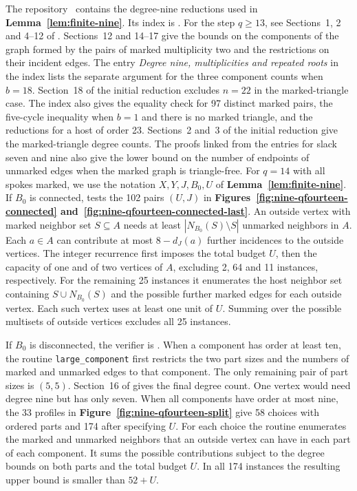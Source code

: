 \documentclass[preprint,11pt,numbers]{elsarticle-arxiv}
\numberwithin{equation}{section}
\theoremstyle{definition}
\begin{document}
The repository~\cite{FGSTCode} contains the degree-nine reductions
used in \textbf{Lemma~\ref{lem:finite-nine}}. Its index is
. For the step $q\geq13$, see
Sections~1, 2 and 4--12 of .
Sections~12 and 14--17 give the bounds on the components of the
graph formed by the pairs of marked multiplicity two and the
restrictions on their incident edges.
The entry \emph{Degree nine, multiplicities and repeated roots} in
the index lists the separate argument for the three component
counts when $b=18$. Section~18 of the initial reduction excludes
$n=22$ in the marked-triangle case.
The index also gives the equality check for 97 distinct marked
pairs, the five-cycle inequality when $b=1$ and there is no marked
triangle, and the reductions for a host of order 23. Sections~2
and~3 of the initial reduction give the marked-triangle degree counts.
The proofs linked from the entries for slack seven and nine also
give the lower bound on the number of endpoints of unmarked edges
when the marked graph is triangle-free.
For $q=14$ with all spokes marked, we use the notation $X,Y,J,B_0,U$
of \textbf{Lemma~\ref{lem:finite-nine}}. If $B_0$ is connected,
 tests the 102 pairs $(U,J)$ in
\textbf{Figures~\ref{fig:nine-qfourteen-connected}
and~\ref{fig:nine-qfourteen-connected-last}}. An outside vertex with
marked neighbor set $S\subseteq A$ needs at least
$|N_{B_0}(S)\setminus S|$ unmarked neighbors in $A$. Each $a\in A$
can contribute at most $8-d_J(a)$ further incidences to the outside
vertices. The integer recurrence first imposes the total budget $U$,
then the capacity of one and of two vertices of $A$, excluding
2, 64 and 11 instances, respectively. For the remaining 25 instances
it enumerates the host neighbor set containing $S\cup N_{B_0}(S)$
and the possible further marked edges for each outside vertex.
Each such vertex uses at least one unit of $U$.
Summing over the possible multisets of outside vertices excludes
all 25 instances.

If $B_0$ is disconnected, the verifier is
. When a component has order at least
ten, the routine \texttt{large\_component} first restricts the two
part sizes and the numbers of marked and unmarked edges to that
component. The only remaining pair of part sizes is $(5,5)$.
Section~16 of  gives the final
degree count. One vertex would need degree nine but has only seven.
When all components have order at most nine, the 33 profiles in
\textbf{Figure~\ref{fig:nine-qfourteen-split}} give 58 choices with
ordered parts and 174 after specifying $U$. For each choice the
routine enumerates the marked and unmarked neighbors that an outside
vertex can have in each part of each component. It sums the possible
contributions subject to the degree bounds on both parts and the
total budget $U$. In all 174 instances the resulting upper bound
is smaller than $52+U$.
\end{document}
